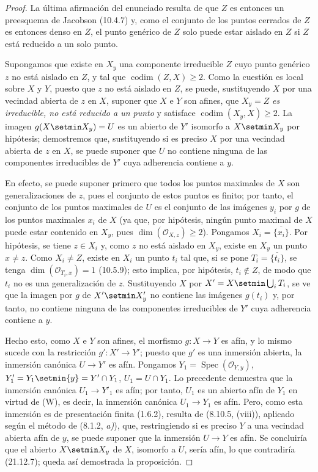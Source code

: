\begin{proof}
La última afirmación del enunciado resulta de que $Z$ es entonces un preesquema de
Jacobson (10.4.7) y, como el conjunto de los puntos cerrados de $Z$ es entonces denso en
$Z$, el punto genérico de $Z$ solo puede estar aislado en $Z$ si $Z$ está reducido a un
solo punto.


Supongamos que existe en $X_y$ una componente irreducible $Z$ cuyo punto
genérico $z$ no está aislado en $Z$, y tal que $\operatorname{codim}(Z,X)\geq2$.
Como la cuestión es local 
sobre $X$ y $Y$, puesto que $z$ no está aislado en $Z$, se puede,
sustituyendo $X$ por una vecindad abierta de $z$ en $X$, suponer que $X$ e $Y$ son afines,
que $X_y=Z$ \emph{es irreducible, no está reducido a un punto} y satisface
$\operatorname{codim}(X_y,X)\geq2$. La imagen $g(X\setmin X_y)=U$ es un abierto de $Y'$
isomorfo a $X\setmin X_y$ por hipótesis; demostremos que, sustituyendo si es preciso $X$ por una
vecindad abierta de $z$ en $X$, se puede suponer que $U$ no contiene ninguna de las
componentes irreducibles de $Y'$ cuya adherencia contiene a $y$.

En efecto, se puede suponer primero que todos los puntos maximales de $X$ son
generalizaciones de $z$, pues el conjunto de estos puntos es finito; por tanto, el conjunto de los puntos
maximales de $U$ es el conjunto de las imágenes $y_i$ por $g$ de los puntos maximales $x_i$ de
$X$ (ya que, por hipótesis, ningún punto maximal de $X$ puede estar contenido en $X_y$,
pues $\dim(\mathcal O_{X,z})\geq2$). Pongamos $X_i=\overline{\{x_i\}}$. Por
hipótesis, se tiene $z\in X_i$ y, como $z$ no está aislado en $X_y$, existe en
$X_y$ un punto $x\ne z$. Como $X_i\ne Z$, existe en $X_i$ un punto $t_i$ tal
que, si se pone $T_i=\overline{\{t_i\}}$, se tenga $\dim(\mathcal O_{T_i,x})=1$
(10.5.9); esto implica, por hipótesis, $t_i\notin Z$, de modo que $t_i$ no es una
generalización de $z$. Sustituyendo $X$ por $X'=X\setmin\bigcup_iT_i$, se ve que la imagen por
$g$ de $X'\setmin X'_y$ no contiene las imágenes $g(t_i)$ y, por tanto, no contiene ninguna de las
componentes irreducibles de $Y'$ cuya adherencia contiene a $y$.

Hecho esto, como $X$ e $Y$ son afines, el morfismo $g:X\to Y$ es afín, y lo
mismo sucede con la restricción $g':X'\to Y'$; puesto que $g'$ es una inmersión abierta,
la inmersión canónica $U\to Y'$ es afín. Pongamos
$Y_1=\operatorname{Spec}(\mathcal O_{Y,y})$, $Y'_1=Y_1\setmin\{y\}=Y'\cap Y_1$,
$U_1=U\cap Y_1$. Lo precedente demuestra que la inmersión canónica $U_1\to Y'_1$ es
afín; por tanto, $U_1$ es un abierto afín de $Y_1$ en virtud de (W), es decir, la
inmersión canónica $U_1\to Y_1$ es afín. Pero, como esta inmersión es de
presentación finita (1.6.2), resulta de (8.10.5, (viii)), aplicado según el método de
(8.1.2, \emph{a)}), que, restringiendo si es preciso $Y$ a una vecindad abierta afín de $y$, se puede
suponer que la inmersión $U\to Y$ es afín. Se concluiría que el abierto $X\setmin X_y$ de
$X$, isomorfo a $U$, sería afín, lo que contradiría (21.12.7); queda así demostrada la
proposición.
\end{proof}

